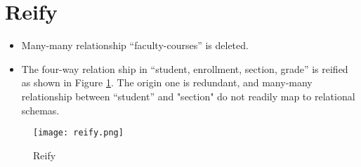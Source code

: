 \documentclass[12pt]{article}
\begin{document}
\section{Reify}
\begin{itemize}
    \item Many-many relationship ``faculty-courses'' is deleted.
    \item The four-way relation ship in ``student, enrollment, section, grade'' is reified as shown in Figure \ref{rei}. The origin one is redundant, and many-many relationship between ``student'' and "section" do not readily map to relational schemas. 
\end{itemize}
\begin{figure}[H]
\centering
\texttt{[image: reify.png]}
\caption{Reify}
\label{rei}
\end{figure}
\vfill
\end{document}
